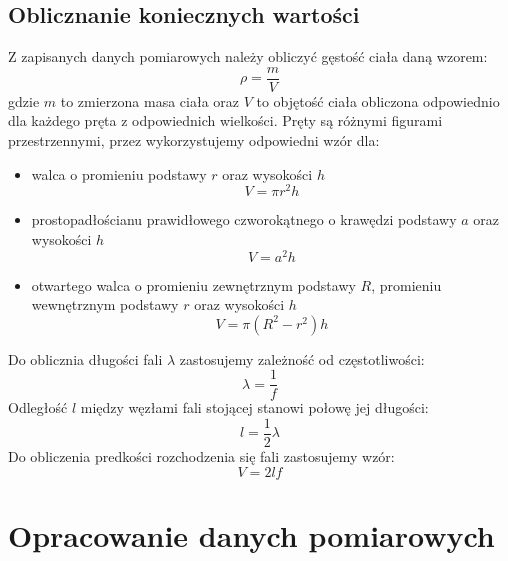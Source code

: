 \documentclass[a4paper,12pts]{article}
\begin{document}
	\subsection{Oblicznanie koniecznych wartości}
	Z zapisanych danych pomiarowych należy obliczyć gęstość ciała daną wzorem:
	\begin{equation}
		\rho = \frac{m}{V}
	\end{equation}
	gdzie $m$ to zmierzona masa ciała oraz $V$ to objętość ciała obliczona odpowiednio dla każdego pręta z odpowiednich wielkości. Pręty są różnymi figurami przestrzennymi, przez wykorzystujemy odpowiedni wzór dla:
	\begin{itemize}
		\item walca o promieniu podstawy $r$ oraz wysokości $h$
		\begin{equation}
			V = \pi r^2 h
		\end{equation}
		
		\item prostopadłościanu prawidłowego czworokątnego o krawędzi podstawy $a$ oraz wysokości $h$
		\begin{equation}
			V = a^2 h
		\end{equation}
		
		\item otwartego walca o promieniu zewnętrznym podstawy $R$, promieniu wewnętrznym podstawy $r$ oraz wysokości $h$
		\begin{equation}
			V = \pi (R^2 - r^2) h
		\end{equation}
	\end{itemize}
	Do oblicznia długości fali $\lambda$ zastosujemy zależność od częstotliwości:
	\begin{equation}
		\lambda = \frac{1}{f}
	\end{equation}
	Odległość $l$ między węzłami fali stojącej stanowi połowę jej długości:
	\begin{equation}
		l = \frac{1}{2} \lambda
	\end{equation}
	Do obliczenia predkości rozchodzenia się fali zastosujemy wzór:
	\begin{equation}
		V = 2lf
	\end{equation}
		
	
	\section{Opracowanie danych pomiarowych}
	
\end{document}
